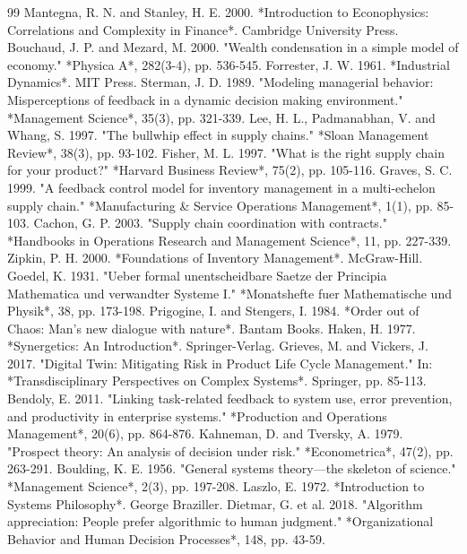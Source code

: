 \documentclass[11pt,a4paper]{article}
\begin{document}
\begin{thebibliography}{99}
 Mantegna, R. N. and Stanley, H. E. 2000. *Introduction to Econophysics: Correlations and Complexity in Finance*. Cambridge University Press.
 Bouchaud, J. P. and Mezard, M. 2000. "Wealth condensation in a simple model of economy." *Physica A*, 282(3-4), pp. 536-545.
 Forrester, J. W. 1961. *Industrial Dynamics*. MIT Press.
 Sterman, J. D. 1989. "Modeling managerial behavior: Misperceptions of feedback in a dynamic decision making environment." *Management Science*, 35(3), pp. 321-339.
 Lee, H. L., Padmanabhan, V. and Whang, S. 1997. "The bullwhip effect in supply chains." *Sloan Management Review*, 38(3), pp. 93-102.
 Fisher, M. L. 1997. "What is the right supply chain for your product?" *Harvard Business Review*, 75(2), pp. 105-116.
 Graves, S. C. 1999. "A feedback control model for inventory management in a multi-echelon supply chain." *Manufacturing \& Service Operations Management*, 1(1), pp. 85-103.
 Cachon, G. P. 2003. "Supply chain coordination with contracts." *Handbooks in Operations Research and Management Science*, 11, pp. 227-339.
 Zipkin, P. H. 2000. *Foundations of Inventory Management*. McGraw-Hill.
 Goedel, K. 1931. "Ueber formal unentscheidbare Saetze der Principia Mathematica und verwandter Systeme I." *Monatshefte fuer Mathematische und Physik*, 38, pp. 173-198.
 Prigogine, I. and Stengers, I. 1984. *Order out of Chaos: Man's new dialogue with nature*. Bantam Books.
 Haken, H. 1977. *Synergetics: An Introduction*. Springer-Verlag.
 Grieves, M. and Vickers, J. 2017. "Digital Twin: Mitigating Risk in Product Life Cycle Management." In: *Transdisciplinary Perspectives on Complex Systems*. Springer, pp. 85-113.
 Bendoly, E. 2011. "Linking task-related feedback to system use, error prevention, and productivity in enterprise systems." *Production and Operations Management*, 20(6), pp. 864-876.
 Kahneman, D. and Tversky, A. 1979. "Prospect theory: An analysis of decision under risk." *Econometrica*, 47(2), pp. 263-291.
 Boulding, K. E. 1956. "General systems theory—the skeleton of science." *Management Science*, 2(3), pp. 197-208.
 Laszlo, E. 1972. *Introduction to Systems Philosophy*. George Braziller.
 Dietmar, G. et al. 2018. "Algorithm appreciation: People prefer algorithmic to human judgment." *Organizational Behavior and Human Decision Processes*, 148, pp. 43-59.
\end{thebibliography}
\end{document}
